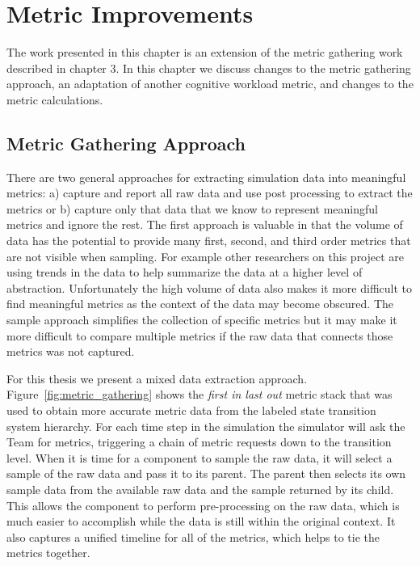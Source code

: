 \chapter{Metric Improvements} \label{ch:metrics}

The work presented in this chapter is an extension of the metric gathering work described in chapter 3.  In this chapter we discuss changes to the metric gathering approach, an adaptation of another cognitive workload metric, and changes to the metric calculations.

\section{Metric Gathering Approach}

There are two general approaches for extracting simulation data into meaningful metrics: a) capture and report all raw data and use post processing to extract the metrics or b) capture only that data that we know to represent meaningful metrics and ignore the rest.  The first approach is valuable in that the volume of data has the potential to provide many first, second, and third order metrics that are not visible when sampling.  For example other researchers on this project are using trends in the data to help summarize the data at a higher level of abstraction.  Unfortunately the high volume of data also makes it more difficult to find meaningful metrics as the context of the data may become obscured.  The sample approach simplifies the collection of specific metrics but it may make it more difficult to compare multiple metrics if the raw data that connects those metrics was not captured.

For this thesis we present a mixed data extraction approach.  Figure~\ref{fig:metric_gathering} shows the \textit{first in last out} metric stack that was used to obtain more accurate metric data from the labeled state transition system hierarchy.  For each time step in the simulation the simulator will ask the Team for metrics, triggering a chain of metric requests down to the transition level.  When it is time for a component to sample the raw data, it will select a sample of the raw data and pass it to its parent.  The parent then selects its own sample data from the available raw data and the sample returned by its child.  This allows the component to perform pre-processing on the raw data, which is much easier to accomplish while the data is still within the original context.  It also captures a unified timeline for all of the metrics, which helps to tie the metrics together.  

